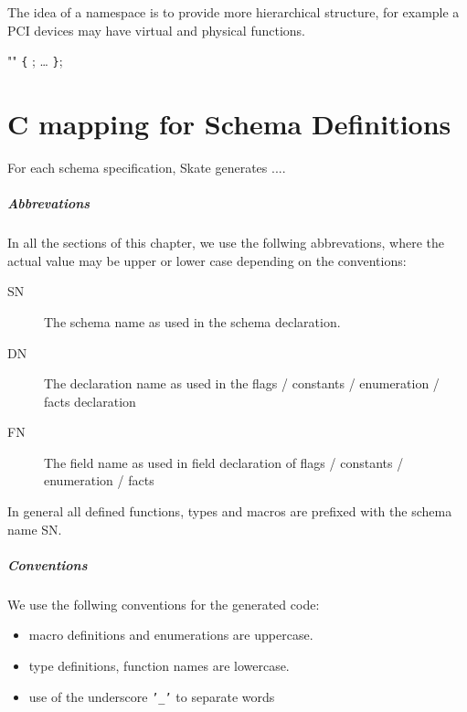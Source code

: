 \documentclass[a4paper,11pt,twoside]{report}
\begin{document}
{{The idea of a namespace is to provide more hierarchical structure, for example
a PCI devices may have virtual and physical functions.


\begin{syntax}
  "" \verb+{+
    ;
    \ldots
\verb+}+;
\end{syntax}


\chapter{C mapping for Schema Definitions}
\label{chap:cmapping}

For each schema specification, Skate generates ....

\paragraph{Abbrevations}
In all the sections of this chapter, we use the follwing abbrevations, where 
the actual value may be upper or lower case depending on the conventions:

\begin{description}
  \item[SN] The schema name as used in the schema declaration.
  \item[DN] The declaration name as used in the flags / constants / 
            enumeration / facts declaration
  \item[FN] The field name as used in field declaration of flags / constants / 
            enumeration / facts
\end{description}

In general all defined functions, types and macros are prefixed with the schema
name SN.

\paragraph{Conventions}
We use the follwing conventions for the generated code:
\begin{itemize}
  \item macro definitions and enumerations are uppercase.
  \item type definitions, function names are lowercase.
  \item use of the underscore \texttt{'\_'} to separate words
\end{itemize}

}}
\end{document}
